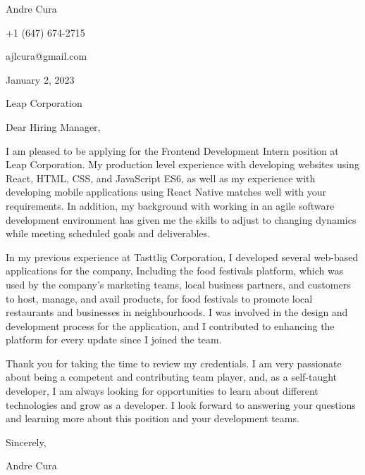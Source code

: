 \documentclass[letterpaper,12pt]{article}
\begin{document}
Andre Cura

+1 (647) 674-2715

ajlcura@gmail.com

\vspace{0.25in}

January 2, 2023

\vspace{0.25in}

Leap Corporation

\vspace{0.5in}

Dear Hiring Manager,

\vspace{0.5in}

I am pleased to be applying for the Frontend Development Intern position at Leap Corporation.
My production level experience with developing websites using React, HTML, CSS, and JavaScript ES6,
as well as my experience with developing mobile applications using React Native
matches well with your requirements.
In addition, my background with working in an agile software development environment
has given me the skills to adjust to changing dynamics
while meeting scheduled goals and deliverables.

\vspace{0.25in}

In my previous experience at Tasttlig Corporation,
I developed several web-based applications for the company,
Including the food festivals platform,
which was used by the company's marketing teams,
local business partners, and customers
to host, manage, and avail products, for food festivals
to promote local restaurants and businesses in neighbourhoods.
I was involved in the design and development process for the application,
and I contributed to enhancing the platform for every update since I joined the team.

% 

\vspace{0.25in}

Thank you for taking the time to review my credentials.
I am very passionate about being a competent and contributing team player, and,
as a self-taught developer, I am always looking for opportunities
to learn about different technologies and grow as a developer.
I look forward to answering your questions and learning more about this position
and your development teams.

\vspace{0.5in}
Sincerely,

Andre Cura
\end{document}
